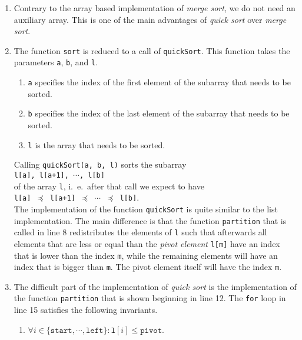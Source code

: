\begin{enumerate}
\item Contrary to the array based implementation of \emph{merge sort}, we do not need an auxiliary
      array.  This is one of the main advantages of \emph{quick sort} over \emph{merge sort}.
\item The function \texttt{sort} is reduced to a call of \texttt{quickSort}.  This function
      takes the parameters \texttt{a}, \texttt{b}, and \texttt{l}.  
      \begin{enumerate}
      \item \texttt{a} specifies the index of the first element of the subarray that needs to be
            sorted.
      \item \texttt{b} specifies the index of the last element of the subarray that needs to be
            sorted. 
      \item \texttt{l} is the array that needs to be sorted.
      \end{enumerate}
      Calling \texttt{quickSort(a, b, l)} sorts the subarray \\[0.2cm]
      \hspace*{1.3cm} 
      \texttt{l[a], l[a+1], $\cdots$, l[b]}
      \\[0.2cm]
      of the array \texttt{l}, i.~e.~after that call we expect to have\\[0.2cm]
      \hspace*{1.3cm}
      \texttt{l[a] $\preceq$ l[a+1] $\preceq$ $\cdots$ $\preceq$ l[b]}.
      \\[0.2cm]
      The implementation of the function \texttt{quickSort}
      is quite similar to the list implementation.  The main difference is that the function
      \texttt{partition} that is called in line 8 redistributes the elements of \texttt{l} such that
      afterwards all elements that are less or equal than the \emph{pivot element} \texttt{l[m]}
      have an index that is lower than the index \texttt{m}, while the remaining elements will have
      an index that is bigger than \texttt{m}.  The pivot element itself will have the index \texttt{m}.
\item The difficult part of the implementation of \emph{quick sort} is the implementation of the
      function \texttt{partition} that is shown beginning in line 12.
      The \texttt{for} loop in line 15 satisfies the following invariants.
      \begin{enumerate}
      \item $\forall i \in \{ \mathtt{start}, \cdots, \mathtt{left} \} : \mathtt{l}[i] \leq \mathtt{pivot}$.


\end{enumerate}
\end{enumerate}

